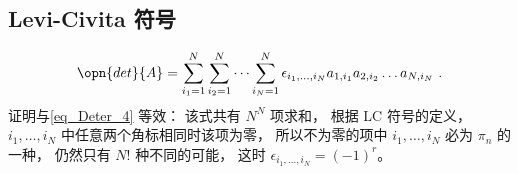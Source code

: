 \subsection{Levi-Civita 符号}
\begin{equation}
\opn{det}{A} = \sum_{i_1 = 1}^N \sum_{i_2 = 1}^N \dots \sum_{i_N = 1}^N \epsilon_{i_1, \dots, i_N} a_{1,i_1}a_{2,i_2}\dots a_{N,i_N}~.
\end{equation}
证明与\autoref{eq_Deter_4} 等效： 该式共有 $N^N$ 项求和， 根据 LC 符号的定义， $i_1, \dots, i_N$ 中任意两个角标相同时该项为零， 所以不为零的项中 $i_1, \dots, i_N$ 必为 $\pi_n$ 的一种， 仍然只有 $N!$ 种不同的可能， 这时 $\epsilon_{i_1, \dots, i_N} = (-1)^{r}$。
